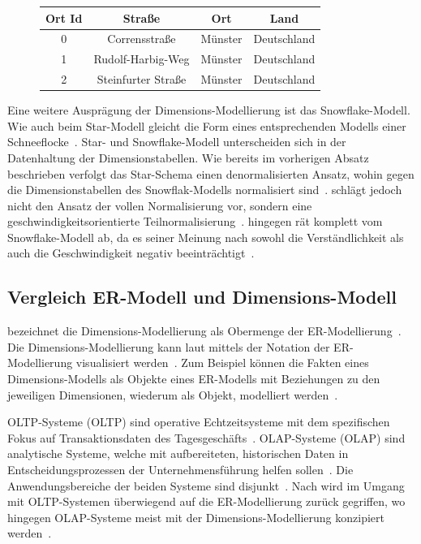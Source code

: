 \documentclass[
  language=german, %
  type=bachelor%
]{isthesis}
\begin{document}
\begin{content}
  \begin{figure}[caption={Beispiel der Dimensionstabelle \textit{Ort}}, label={table:dimension-table}]
    \begin{tabular}{c c c c}
      Ort Id & Straße & Ort & Land \\
      \toprule
      0 & Corrensstraße & Münster & Deutschland \\
      1 & Rudolf-Harbig-Weg & Münster & Deutschland \\
      2 & Steinfurter Straße & Münster & Deutschland \\
    \end{tabular}
  \end{figure}

  Eine weitere Ausprägung der Dimensions-Modellierung ist das Snowflake-Modell.
  Wie auch beim Star-Modell gleicht die Form eines entsprechenden Modells einer
  Schneeflocke~\cite[][S. 70]{Kemper2010}. Star- und Snowflake-Modell
  unterscheiden sich in der Datenhaltung der Dimensionstabellen. Wie bereits im
  vorherigen Absatz beschrieben verfolgt das Star-Schema einen denormalisierten
  Ansatz, wohin gegen die Dimensionstabellen des Snowflak-Modells normalisiert
  sind~\cite[][S. 70]{Kemper2010}. \textsc{\citeauthor{Kemper2010}} schlägt
  jedoch nicht den Ansatz der vollen Normalisierung vor, sondern eine
  geschwindigkeitsorientierte Teilnormalisierung~\cite[][S. 70]{Kemper2010}.
  \textsc{\citeauthor{Kimball2013}} hingegen rät komplett vom Snowflake-Modell
  ab, da es seiner Meinung nach sowohl die Verständlichkeit als auch \ggf{} die
  Geschwindigkeit negativ beeinträchtigt~\cite[][S. 50]{Kimball2013}.

  \subsection{Vergleich ER-Modell und Dimensions-Modell}
  \textsc{\citeauthor{ballard1998data}} bezeichnet die Dimensions-Modellierung
  als Obermenge der ER-Modellierung~\cite[][S. 47]{ballard1998data}. Die
  Dimensions-Modellierung kann laut \textsc{\citeauthor{ballard1998data}}
  mittels der Notation der ER-Modellierung visualisiert werden~\cite[][S.
  47]{ballard1998data}. Zum Beispiel können die Fakten eines Dimensions-Modells
  als Objekte eines ER-Modells mit Beziehungen zu den jeweiligen Dimensionen,
  wiederum als Objekt, modelliert werden~\cite[][S. 48]{ballard1998data}. 

  \acrlong{OLTP}-Systeme (OLTP) sind operative Echtzeitsysteme mit dem
  spezifischen Fokus auf Transaktionsdaten des Tagesgeschäfts~\cite[][S.
  11]{gabriel2009data}. \acrlong{OLAP}-Systeme (OLAP) sind analytische Systeme,
  welche mit aufbereiteten, historischen Daten in Entscheidungsprozessen der
  Unternehmensführung helfen sollen~\cite[][S. 1]{chaudhuri1997overview}. Die
  Anwendungsbereiche der beiden Systeme sind disjunkt~\cite[][S.
  334]{chamoni2000line}. Nach \textsc{\citeauthor{phipps2002automating}} wird
  im Umgang mit \acrshort{OLTP}-Systemen überwiegend auf die ER-Modellierung
  zurück gegriffen, wo hingegen \acrshort{OLAP}-Systeme meist mit der
  Dimensions-Modellierung konzipiert werden~\cite[][S.
  2]{phipps2002automating}. 


\end{content}
\end{document}
